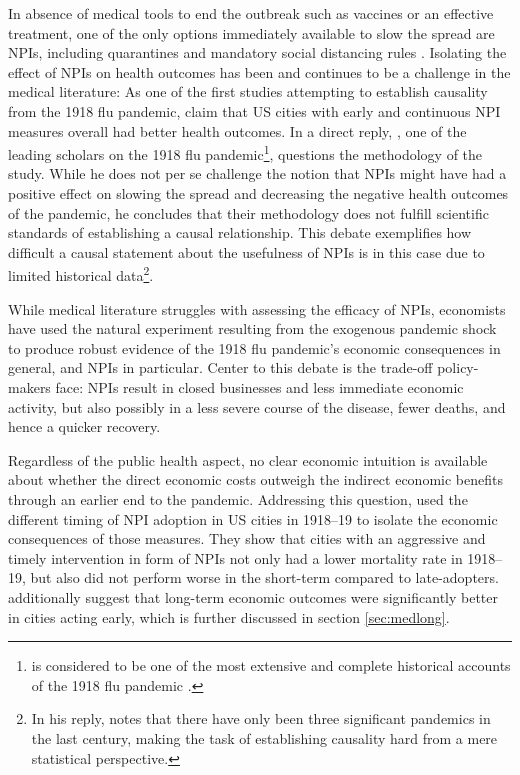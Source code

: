 \documentclass[12pt,a4paper]{article}
\begin{document}
In absence of medical tools to end the outbreak such as vaccines or an effective treatment, one of the only options  immediately available to slow the spread are NPIs, including quarantines and mandatory social distancing rules \citep{aledortNonpharmaceuticalPublicHealth2007}.
Isolating the effect of NPIs on health outcomes has been and continues to be a challenge in the medical literature:
As one of the first studies attempting to establish causality from the 1918 flu pandemic, \cite{markelNonpharmaceuticalInterventionsImplemented2007} claim that US cities with early and continuous NPI measures overall had better health outcomes.
In a direct reply, \cite{barryCommentsNonpharmaceuticalInterventions2007}, one of the leading scholars on the 1918 flu pandemic\footnote{
	\cite{barryGreatInfluenzaEpic2005} is considered to be one of the most extensive and complete historical accounts of the 1918 flu pandemic \citep[see comment by the editor]{barryCommentsNonpharmaceuticalInterventions2007}.}, questions the methodology of the study.
While he does not per se challenge the notion that NPIs might have had a positive effect on slowing the spread and decreasing the negative health outcomes of the pandemic, he concludes that their methodology does not fulfill scientific standards of establishing a causal relationship.
This debate exemplifies how difficult a causal statement about the usefulness of NPIs is in this case due to limited historical data\footnote{In his reply, \cite{barryCommentsNonpharmaceuticalInterventions2007} notes that there have only been three significant pandemics in the last century, making the task of establishing causality hard from a mere statistical perspective.}.

While medical literature struggles with assessing the efficacy of NPIs, economists have used the natural experiment resulting from the exogenous pandemic shock to produce robust evidence of the 1918 flu pandemic's economic consequences in general, and NPIs in particular.
Center to this debate is the trade-off policy-makers face: NPIs result in closed businesses and less immediate economic activity, but also possibly in a less severe course of the disease, fewer deaths, and hence a quicker recovery.

Regardless of the public health aspect, no clear economic intuition is available about whether the direct economic costs outweigh the indirect economic benefits through an earlier end to the pandemic.
Addressing this question, \cite{correiaPandemicsDepressEconomy2020} used the different timing of NPI adoption in US cities in 1918--19 to isolate the economic consequences of those measures.
They show that cities with an aggressive and timely intervention in form of NPIs not only had a lower mortality rate in 1918--19, but also did not perform worse in the short-term compared to late-adopters.
\cite{correiaPandemicsDepressEconomy2020} additionally suggest that long-term economic outcomes were significantly better in cities acting early, which is further discussed in section \ref{sec:medlong}.
\end{document}
